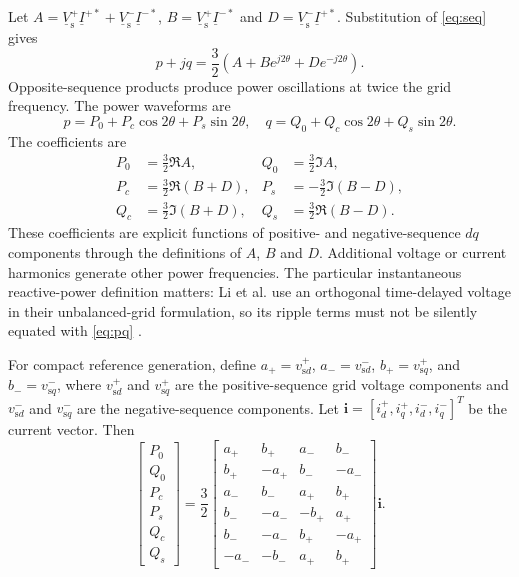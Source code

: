 Let \(A=\underline V_{\mathrm{s}}^+\underline I^{+*}+\underline V_{\mathrm{s}}^-\underline I^{-*}\), \(B=\underline V_{\mathrm{s}}^+\underline I^{-*}\) and \(D=\underline V_{\mathrm{s}}^-\underline I^{+*}\). Substitution of \eqref{eq:seq} gives
\begin{equation}\label{eq:complex}
p+jq=\frac32\left(A+Be^{j2\theta}+De^{-j2\theta}\right).
\end{equation}
Opposite-sequence products produce power oscillations at twice the grid frequency. The power waveforms are
\begin{equation}
p=P_0+P_c\cos2\theta+P_s\sin2\theta,\quad
q=Q_0+Q_c\cos2\theta+Q_s\sin2\theta.
\end{equation}
The coefficients are
\begin{equation}\label{eq:coeff}
\begin{aligned}
P_0&=\tfrac32\Re A,& Q_0&=\tfrac32\Im A,\\
P_c&=\tfrac32\Re(B+D),& P_s&=-\tfrac32\Im(B-D),\\
Q_c&=\tfrac32\Im(B+D),& Q_s&=\tfrac32\Re(B-D).
\end{aligned}
\end{equation}
These coefficients are explicit functions of positive- and negative-sequence \(dq\) components through the definitions of \(A\), \(B\) and \(D\). Additional voltage or current harmonics generate other power frequencies. The particular instantaneous reactive-power definition matters: Li et al. use an orthogonal time-delayed voltage in their unbalanced-grid formulation, so its ripple terms must not be silently equated with \eqref{eq:pq} \cite{li2010journal}.

For compact reference generation, define \(a_+=v_{\mathrm{s}d}^+\), \(a_-=v_{\mathrm{s}d}^-\), \(b_+=v_{\mathrm{s}q}^+\), and \(b_-=v_{\mathrm{s}q}^-\), where \(v_{\mathrm{s}d}^+\) and \(v_{\mathrm{s}q}^+\) are the positive-sequence grid voltage components and \(v_{\mathrm{s}d}^-\) and \(v_{\mathrm{s}q}^-\) are the negative-sequence components. Let \(\bm i=[i_d^+,i_q^+,i_d^-,i_q^-]^T\) be the current vector. Then
\begin{equation}\label{eq:matrix}
\begin{bmatrix}P_0\\Q_0\\P_c\\P_s\\Q_c\\Q_s\end{bmatrix}
=\frac32
\begin{bmatrix}
a_+&b_+&a_-&b_-\\
b_+&-a_+&b_-&-a_-\\
a_-&b_-&a_+&b_+\\
b_-&-a_-&-b_+&a_+\\
b_-&-a_-&b_+&-a_+\\
-a_-&-b_-&a_+&b_+
\end{bmatrix}\bm i.
\end{equation}

